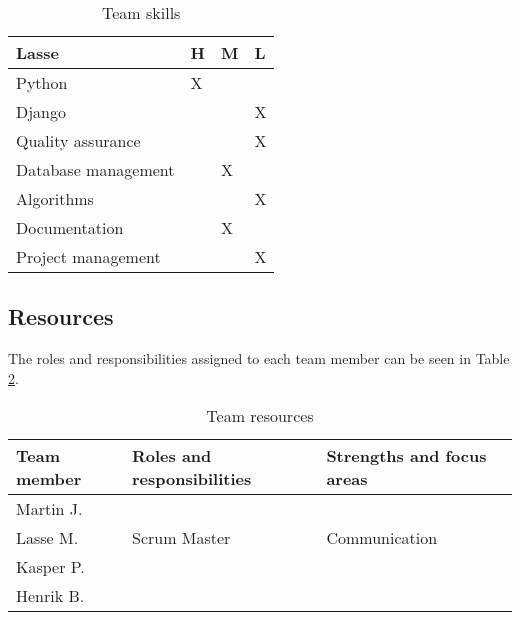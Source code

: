 \begin{table}[!ht]
{        \centering
        \small
        \begin{tabular}{l|l|l|l}
            \rowcolor{Gray}
            \textbf{Lasse} & \textbf{H} & \textbf{M} & \textbf{L}\\\hline
             Python & X & &\\
             Django & & & X\\
             Quality assurance & & & X\\
             Database management & & X &\\
             Algorithms & & & X\\
             Documentation & & X &\\
             Project management & & & X
        \end{tabular}
        }%
    \caption{Team skills}
    \label{tab:skills}
\end{table}

\subsection{Resources}
The roles and responsibilities assigned to each team member can be seen in Table \ref{tab:resources}.


\begin{table}[!ht]
    \centering
    \begin{tabular}{l|l|l}
        \rowcolor{Gray}
        \textbf{Team member} & \textbf{Roles and responsibilities} & \textbf{Strengths and focus areas}\\\hline
        Martin J.            &&\\
        Lasse M.             & Scrum Master & Communication\\
        Kasper P.            & &\\
        Henrik B.            & &
    \end{tabular}
    \caption{Team resources}
    \label{tab:resources}
\end{table}

